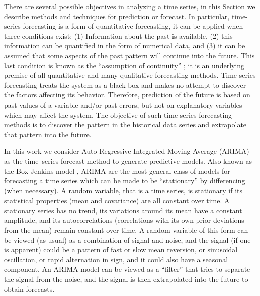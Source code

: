 There are several possible objectives in analyzing a time series, in this Section we describe methods and techniques for prediction or forecast. %
%
In particular, time-series forecasting is a form of quantitative forecasting, it can be applied when three conditions exist: (1) Information about the past is available, (2) this information can be quantified in the form of numerical data, and (3) it can be assumed that some aspects of the past pattern will continue into the future. This last condition is known as the ``assumption of continuity'' \cite{Makridakis2008}; it is an underlying premise of all quantitative and many qualitative forecasting methods. Time series forecasting treats the system as a black box and makes no attempt to discover the factors affecting its behavior. Therefore, prediction of the future is based on past values of a variable and/or past errors, but not on explanatory variables which may affect the system. The objective of such time series forecasting methods is to discover the pattern in the historical data series and extrapolate that pattern into the future. 



In this work we consider Auto Regressive Integrated Moving Average (ARIMA) as the time--series forecast method to generate predictive models. Also known as the Box-Jenkins model \cite{Chatfield2019}, ARIMA are the most general class of models for forecasting a time series which can be made to be ``stationary'' by differencing (when necessary). A random variable, that is a time series, is stationary if its statistical properties (mean and covariance) are all constant over time.  A stationary series has no trend, its variations around its mean have a constant amplitude, and its autocorrelations (correlations with its own prior deviations from the mean) remain constant over time.  A random variable of this form can be viewed (as usual) as a combination of signal and noise, and the signal (if one is apparent) could be a pattern of fast or slow mean reversion, or sinusoidal oscillation, or rapid alternation in sign, and it could also have a seasonal component. An ARIMA model can be viewed as a ``filter'' that tries to separate the signal from the noise, and the signal is then extrapolated into the future to obtain forecasts.

